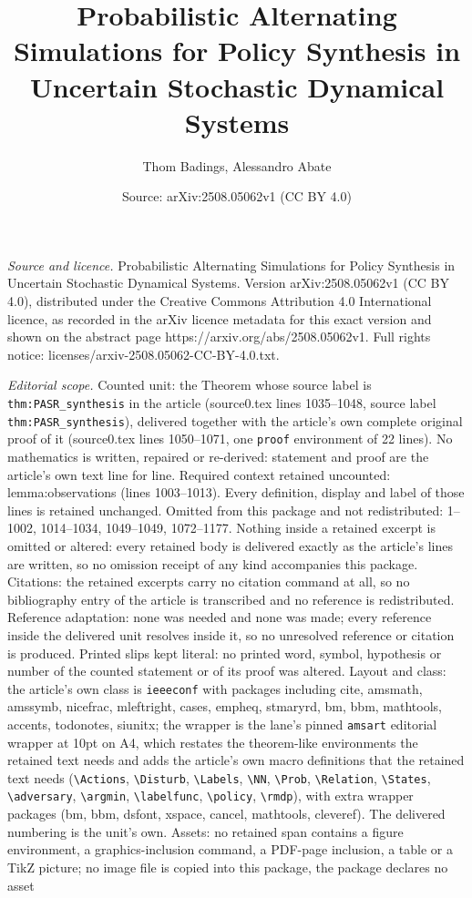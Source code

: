 \documentclass[10pt,a4paper]{amsart}
\title[Probabilistic Alternating Simulations for Policy Synthesis i]{Probabilistic Alternating Simulations for Policy Synthesis in Uncertain Stochastic Dynamical Systems}
\author{Thom Badings, Alessandro Abate}
\date{Source: arXiv:2508.05062v1 (CC BY 4.0)}
\begin{document}
\maketitle

\noindent\emph{Source and licence.} Probabilistic Alternating Simulations for Policy Synthesis in Uncertain Stochastic Dynamical Systems. Version arXiv:2508.05062v1 (CC BY 4.0), distributed under the Creative Commons Attribution 4.0 International licence, as recorded in the arXiv licence metadata for this exact version and shown on the abstract page https://arxiv.org/abs/2508.05062v1. Full rights notice: licenses/arxiv-2508.05062-CC-BY-4.0.txt.\par\smallskip

\noindent\textit{Editorial scope.} Counted unit: the Theorem whose source label is \texttt{thm:PASR\_synthesis} in the article (source0.tex lines 1035--1048, source label \texttt{thm:PASR\_synthesis}), delivered together with the article's own complete original proof of it (source0.tex lines 1050--1071, one \texttt{proof} environment of 22 lines). No mathematics is written, repaired or re-derived: statement and proof are the article's own text line for line. Required context retained uncounted: lemma:observations (lines 1003--1013). Every definition, display and label of those lines is retained unchanged. Omitted from this package and not redistributed: 1--1002, 1014--1034, 1049--1049, 1072--1177. Nothing inside a retained excerpt is omitted or altered: every retained body is delivered exactly as the article's lines are written, so no omission receipt of any kind accompanies this package. Citations: the retained excerpts carry no citation command at all, so no bibliography entry of the article is transcribed and no reference is redistributed. Reference adaptation: none was needed and none was made; every reference inside the delivered unit resolves inside it, so no unresolved reference or citation is produced. Printed slips kept literal: no printed word, symbol, hypothesis or number of the counted statement or of its proof was altered. Layout and class: the article's own class is \texttt{ieeeconf} with packages including cite, amsmath, amssymb, nicefrac, mleftright, cases, empheq, stmaryrd, bm, bbm, mathtools, accents, todonotes, siunitx; the wrapper is the lane's pinned \texttt{amsart} editorial wrapper at 10pt on A4, which restates the theorem-like environments the retained text needs and adds the article's own macro definitions that the retained text needs (\texttt{\textbackslash Actions}, \texttt{\textbackslash Disturb}, \texttt{\textbackslash Labels}, \texttt{\textbackslash NN}, \texttt{\textbackslash Prob}, \texttt{\textbackslash Relation}, \texttt{\textbackslash States}, \texttt{\textbackslash adversary}, \texttt{\textbackslash argmin}, \texttt{\textbackslash labelfunc}, \texttt{\textbackslash policy}, \texttt{\textbackslash rmdp}), with extra wrapper packages (bm, bbm, dsfont, xspace, cancel, mathtools, cleveref). The delivered numbering is the unit's own. Assets: no retained span contains a figure environment, a graphics-inclusion command, a PDF-page inclusion, a table or a TikZ picture; no image file is copied into this package, the package declares no asset 
\end{document}
